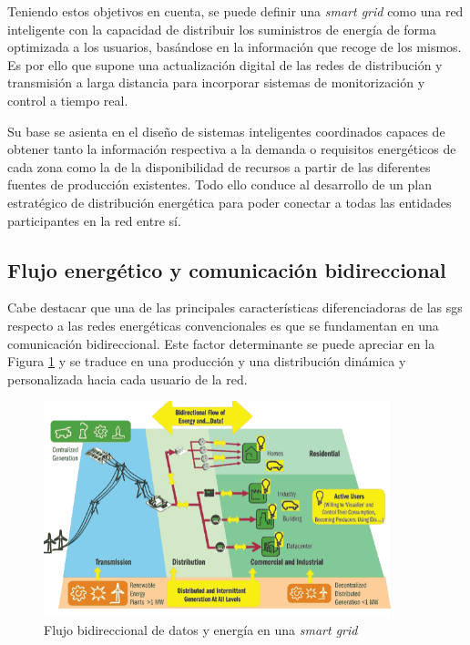 \vspace{1mm}

Teniendo estos objetivos en cuenta, se puede definir una \textit{smart grid} como una red inteligente con la capacidad de distribuir los suministros de energía de forma optimizada a los usuarios, basándose en la información que recoge de los mismos. Es por ello que supone una actualización digital de las redes de distribución y transmisión a larga distancia para incorporar sistemas de monitorización y control a tiempo real. \cite{iotfutura} 

\vspace{3mm}

Su base se asienta en el diseño de sistemas inteligentes coordinados capaces de obtener tanto la información respectiva a la demanda o requisitos energéticos de cada zona como la de la disponibilidad de recursos a partir de las diferentes fuentes de producción existentes. Todo ello conduce al desarrollo de un plan estratégico de distribución energética para poder conectar a todas las entidades participantes en la red entre sí. \cite{repsol}

\vspace{1mm}

\subsection{Flujo energético y comunicación bidireccional}

Cabe destacar que una de las principales características diferenciadoras de las \gls{sg}s respecto a las redes energéticas convencionales es que se fundamentan en una comunicación bidireccional. Este factor determinante se puede apreciar en la Figura \ref{fig:bidireccional} y se traduce en una producción y una distribución dinámica y personalizada hacia cada usuario de la red. 

\begin{figure}[h!]
  \centering
  \includegraphics[width=0.9\textwidth]{img/teoria/sg.png}
  \caption{Flujo bidireccional de datos y energía en una \textit{smart grid} \cite{sins}}
  \label{fig:bidireccional}
\end{figure}

